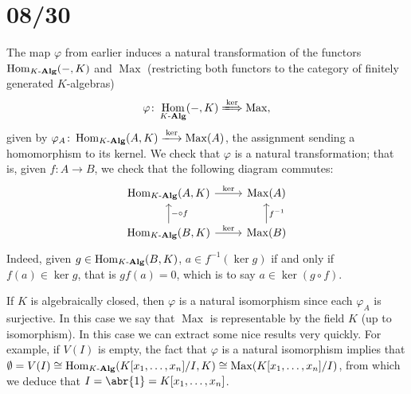 \documentclass[11pt,leqno]{article}
\theoremstyle{plain}
\theoremstyle{definition}
\numberwithin{equation}{section}
\numberwithin{lem}{section}
\DeclareMathOperator{\Hom}{Hom}
\DeclareMathOperator{\Max}{Max}
\newcommand{\catname}[1]{{\normalfont\mathbf{#1}}}
\newcommand{\Kalg}{K\text{-}\catname{Alg}}
\begin{document}
\newpage\section{08/30}
The map $\varphi$ from earlier induces a natural transformation of the functors $\Hom_{\Kalg}(-,K)$ and $\Max$ (restricting both functors to the category of finitely generated $K$-algebras)
\begin{equation}
  \varphi\colon \Hom_{\Kalg}(-,K)\xLongrightarrow{\ker}\Max,
\end{equation}
given by $\varphi_A\colon \Hom_{\Kalg}(A,K)\xlongrightarrow{\ker}\Max(A)$, the assignment sending a homomorphism to its kernel.
We check that $\varphi$ is a natural transformation; that is, given $f\colon A\to B$, we check that the following diagram commutes:
\begin{equation}
  \begin{tikzcd}[ampersand replacement=\&]
    {\Hom_{\Kalg}(A,K)} \& {\Max(A)} \\
    {\Hom_{\Kalg}(B,K)} \& {\Max(B)}
    \arrow["\ker", from=1-1, to=1-2]
    \arrow["{-\circ f}"', from=2-1, to=1-1]
    \arrow["\ker", from=2-1, to=2-2]
    \arrow["{f^{-1}}"', from=2-2, to=1-2]
  \end{tikzcd}
\end{equation}
Indeed, given $g\in \Hom_{\Kalg}(B,K)$, $a\in f^{-1}(\ker g)$ if and only if $f(a)\in \ker g$, that is $gf(a) = 0$, which is to say $a\in \ker (g\circ f)$.

If $K$ is algebraically closed, then $\varphi$ is a natural isomorphism since each $\varphi_A$ is surjective. In this case we say that $\Max$ is representable by the field $K$ (up to isomorphism). In this case we can extract some nice results very quickly. For example, if $V(I)$ is empty, the fact that $\varphi$ is a natural isomorphism implies that $\emptyset = V(I)\cong \Hom_{\Kalg}(K[x_1,\dots,x_n]/I,K)\cong \Max(K[x_1,\dots,x_n]/I)$, from which we deduce that $I= \abr{1} = K[x_1,\dots,x_n]$.
\end{document}
